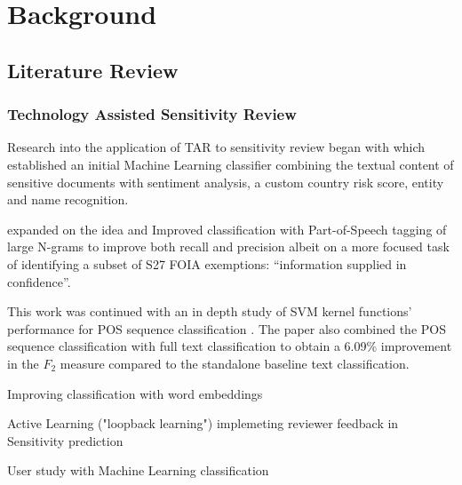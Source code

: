 \documentclass{l4proj}
\begin{document}
\chapter{Background}

\section{Literature Review}

\subsection{Technology Assisted Sensitivity Review}


Research into the application of TAR to sensitivity review began with \textcite{de_rijke_towards_2014} which established an initial Machine Learning classifier combining the textual content of sensitive documents with sentiment analysis, a custom country risk score, entity and name recognition.

\autocite{sanchezDetectingSensitiveInformation2012}

\textcite{mcdonaldUsingPartofSpeechNgrams2015} expanded on the idea and Improved classification with Part-of-Speech tagging of large N-grams to improve both recall and precision albeit on a more focused task of identifying a subset of S27 FOIA exemptions: ``information supplied in confidence''.

This work was continued with an in depth study of SVM kernel functions' performance for POS sequence classification \autocite{mcdonaldStudySVMKernel2017}.
The paper also combined the POS sequence classification with full text classification to obtain a 6.09\% improvement in the $F_{2}$ measure compared to the standalone baseline text classification.

\autocite{jose_enhancing_2017} Improving classification with word embeddings

\autocite{pasi_active_2018} Active Learning ("loopback learning") implemeting reviewer feedback in Sensitivity prediction

\autocite{mcdonaldHowSensitivityClassification2019} User study with Machine Learning classification
\end{document}
